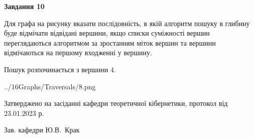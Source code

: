 \documentclass[12pt, ukrainian]{article}
\begin{document}
{\begin {large}
{\begin {center}\textbf{Завдання 10}\end {center}}\par
Для графа на рисунку вказати послідовність, в якій алгоритм пошуку в глибину буде відмічати відвідані вершини, якщо списки суміжності вершин переглядаються алгоритмом за зростанням міток вершин та вершини відмічаються на першому вход\-женні у вершину.\par
Пошук розпочинається з вершини 4.\par

\begin{center}
	{../16Graphs/Traversals/8.png}
\end{center}\par
\newpage


\end {large}
}
{\smallskip \begin {small} Затверджено на засіданні кафедри теоретичної кібернетики, протокол  від   23.01.2023 р.\par\smallskip\smallskip
{\parbox {6.5 cm}{Зав. кафедри \dotfill Ю.В.~Крак}} \end{small}}
\end{document}
